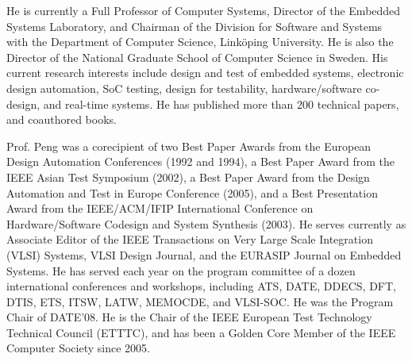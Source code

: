 \documentclass[conference]{IEEEtran}
\begin{document}
  He is currently a Full Professor of Computer Systems, Director of the Embedded Systems Laboratory, and Chairman of the Division for Software and Systems with the Department of Computer Science, Link\"{o}ping University.
  He is also the Director of the National Graduate School of Computer Science in Sweden.
  His current research interests include design and test of embedded systems, electronic design automation, SoC testing, design for testability, hardware/software co-design, and real-time systems.
  He has published more than 200 technical papers, and coauthored books.

  Prof. Peng was a corecipient of two Best Paper Awards from the European Design Automation Conferences (1992 and 1994), a Best Paper Award from the IEEE Asian Test Symposium (2002), a Best Paper Award from the Design Automation and Test in Europe Conference (2005), and a Best Presentation Award from the IEEE/ACM/IFIP International Conference on Hardware/Software Codesign and System Synthesis (2003).
  He serves currently as Associate Editor of the IEEE Transactions on Very Large Scale Integration (VLSI) Systems, VLSI Design Journal, and the EURASIP Journal on Embedded Systems.
  He has served each year on the program committee of a dozen international conferences and workshops, including ATS, DATE, DDECS, DFT, DTIS, ETS, ITSW, LATW, MEMOCDE, and VLSI-SOC.
  He was the Program Chair of DATE'08.
  He is the Chair of the IEEE European Test Technology Technical Council (ETTTC), and has been a Golden Core Member of the IEEE Computer Society since 2005.
\end{document}
